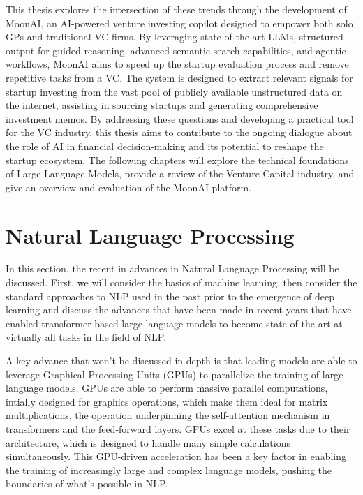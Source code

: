 \documentclass[a4paper, oneside]{discothesis}
\begin{document}
This thesis explores the intersection of these trends through the development of MoonAI, an
AI-powered venture investing copilot designed to empower both solo GPs and traditional VC firms.
By leveraging state-of-the-art LLMs, structured output for guided reasoning, advanced
semantic search capabilities, and agentic workflows, MoonAI aims to speed up the startup evaluation process and remove repetitive tasks from a VC. The
system is designed to extract relevant signals for startup investing from the vast pool of
publicly available unstructured data on the internet, assisting in sourcing startups and
generating comprehensive investment memos. By addressing these questions and developing a practical tool for the VC industry, this thesis
aims to contribute to the ongoing dialogue about the role of AI in financial decision-making and
its potential to reshape the startup ecosystem. The following chapters will explore the
technical foundations of Large Language Models, provide a review of the Venture Capital industry, and give an overview and evaluation of the MoonAI platform. 

\chapter{Natural Language Processing}

In this section, the recent in advances in Natural Language Processing will be discussed. First, we will consider the basics of machine learning, 
then consider the standard approaches to NLP used in the past prior to the emergence of deep learning and discuss the advances that have been made in recent years that have enabled transformer-based large language models to become state of the art at virtually all tasks in the field of NLP.

A key advance that won't be discussed in depth is that leading models are able to leverage Graphical Processing Units (GPUs) to parallelize the training of large language models. GPUs are able to perform massive parallel computations, intially designed for graphics operations, which make them ideal for matrix multiplications, the operation underpinning the self-attention mechanism in transformers and the feed-forward layers. GPUs excel at these tasks due to their architecture, which is designed to handle many simple calculations simultaneously.
This GPU-driven acceleration has been a key factor in enabling the training of increasingly large and complex language models, pushing the boundaries of what's possible in NLP.
\end{document}
